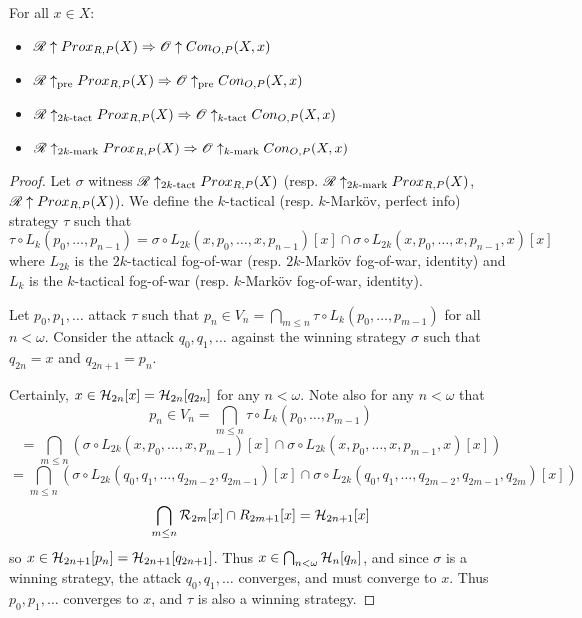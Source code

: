 \begin{theorem}
For all $x\in X$:
  \begin{itemize}
    \item
      $\mathscr{R}\uparrow Prox_{R,P}(X) \Rightarrow \mathscr{O} \uparrow Con_{O,P}(X,x)$
    \item
      $\mathscr{R}\uparrow_{\text{pre}} Prox_{R,P}(X) \Rightarrow \mathscr{O} \uparrow_{\text{pre}} Con_{O,P}(X,x)$
    \item
      $\mathscr{R}\uparrow_{2k\text{-tact}} Prox_{R,P}(X) \Rightarrow \mathscr{O} \uparrow_{k\text{-tact}} Con_{O,P}(X,x)$
    \item
      $\mathscr{R}\uparrow_{2k\text{-mark}} Prox_{R,P}(X) \Rightarrow \mathscr{O} \uparrow_{k\text{-mark}} Con_{O,P}(X,x)$
  \end{itemize}
\end{theorem}

\begin{proof}
Let $\sigma$ witness $\mathscr{R} \uparrow_{2k\text{-tact}}Prox_{R,P}(X)$ (resp. $\mathscr{R} \uparrow_{2k\text{-mark}}Prox_{R,P}(X)$, $\mathscr{R}\uparrow Prox_{R,P}(X)$). We define the $k$-tactical (resp. $k$-Mark\"ov, perfect info) strategy $\tau$ such that
  \[
    \tau\circ L_k(p_0,\dots,p_{n-1})
      =
    \sigma\circ L_{2k}(x,p_0,\dots,x,p_{n-1})[x]
      \cap
    \sigma\circ L_{2k}(x,p_0,\dots,x,p_{n-1},x)[x]
  \]
where $L_{2k}$ is the $2k$-tactical fog-of-war (resp. $2k$-Mark\"ov fog-of-war, identity) and $L_{k}$ is the $k$-tactical fog-of-war (resp. $k$-Mark\"ov fog-of-war, identity).

Let $p_0,p_1,\dots$ attack $\tau$ such that $p_n\in V_n=\bigcap_{m\leq n}\tau\circ L_k(p_0,\dots,p_{m-1})$ for all $n<\omega$. Consider the attack $q_0,q_1,\dots$ against the winning strategy $\sigma$ such that $q_{2n}=x$ and $q_{2n+1}=p_n$. 

Certainly, $x\in \mathcal{H}_{2n}[x]= \mathcal{H}_{2n}[q_{2n}]$ for any $n<\omega$. Note also for any $n<\omega$ that 
    \[
      p_n \in 
      V_n =
      \bigcap_{m\leq n}\tau\circ L_k(p_0,\dots,p_{m-1})
    \]
    \[
      =
      \bigcap_{m\leq n}\left(
        \sigma\circ L_{2k}(x,p_0,\dots,x,p_{m-1})[x]\cap
        \sigma\circ L_{2k}(x,p_0,\dots,x,p_{m-1},x)[x]
      \right)
    \]
    \[
      =
      \bigcap_{m\leq n}\left(
        \sigma\circ L_{2k}(q_0,q_1,\dots,q_{2m-2},q_{2m-1})[x]\cap
        \sigma\circ L_{2k}(q_0,q_1,\dots,q_{2m-2},q_{2m-1},q_{2m})[x]
      \right)
    \]
    \[
      \bigcap_{m\leq n}\mathcal{R}_{2m}[x]\cap R_{2m+1}[x]=
      \mathcal{H}_{2n+1}[x]
    \]
so $x\in\mathcal{H}_{2n+1}[p_n]=\mathcal{H}_{2n+1}[q_{2n+1}]$. Thus $x\in \bigcap_{n<\omega} \mathcal{H}_n[q_n]$, and since $\sigma$ is a winning strategy, the attack $q_0,q_1,\dots$ converges, and must converge to $x$. Thus $p_0,p_1,\dots$ converges to $x$, and $\tau$ is also a winning strategy.
\end{proof}

